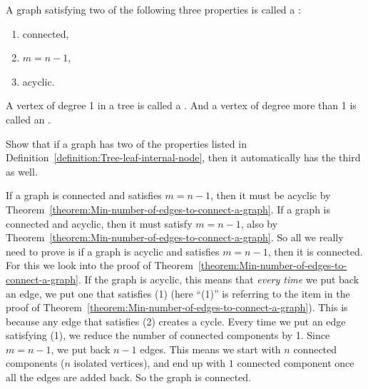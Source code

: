 \begin{definition}
\label{definition:Tree-leaf-internal-node}
A graph satisfying two of the following three properties is called a : 
\begin{enumerate}
    \item connected, 
    \item $m = n-1$, 
    \item acyclic.
\end{enumerate}
A vertex of degree 1 in a tree is called a . And a vertex of degree more than 1 is called an .

\end{definition}

\begin{flex}
\label{grp:exercise:Equivalent-definitions-of-a-tree}

\begin{exercise}
\label{exercise:Equivalent-definitions-of-a-tree}
Show that if a graph has two of the properties listed in Definition~\ref{definition:Tree-leaf-internal-node}, then it automatically has the third as well.

\end{exercise}

\begin{solution}
\label{sol:intro-to-graph-theory::graph}
If a graph is connected and satisfies $m = n-1$, then it must be acyclic by Theorem~\ref{theorem:Min-number-of-edges-to-connect-a-graph}. If a graph is connected and acyclic, then it must satisfy $m = n-1$, also by Theorem~\ref{theorem:Min-number-of-edges-to-connect-a-graph}. So all we really need to prove is if a graph is acyclic and satisfies $m=n-1$, then it is connected. For this we look into the proof of Theorem~\ref{theorem:Min-number-of-edges-to-connect-a-graph}. If the graph is acyclic, this means that \emph{every time} we put back an edge, we put one that satisfies (1) (here ``(1)'' is referring to the item in the proof of Theorem~\ref{theorem:Min-number-of-edges-to-connect-a-graph}). This is because any edge that satisfies (2) creates a cycle. Every time we put an edge satisfying (1), we reduce the number of connected components by 1. Since $m = n-1$, we put back $n-1$ edges. This means we start with $n$ connected components ($n$ isolated vertices), and end up with $1$ connected component once all the edges are added back. So the graph is connected.

\end{solution}
\end{flex}

